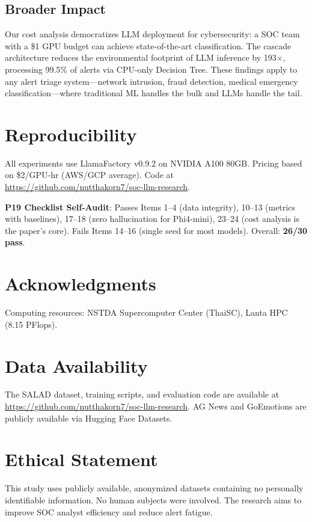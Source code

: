 \documentclass[review,3p]{elsarticle}
\begin{document}
\subsection{Broader Impact}
Our cost analysis democratizes LLM deployment for cybersecurity: a SOC team with a \$1 GPU budget can achieve state-of-the-art classification. The cascade architecture reduces the environmental footprint of LLM inference by 193$\times$, processing 99.5\% of alerts via CPU-only Decision Tree. These findings apply to any alert triage system---network intrusion, fraud detection, medical emergency classification---where traditional ML handles the bulk and LLMs handle the tail.

\section*{Reproducibility}
All experiments use LlamaFactory v0.9.2 on NVIDIA A100 80GB. Pricing based on \$2/GPU-hr (AWS/GCP average). Code at \url{https://github.com/nutthakorn7/soc-llm-research}.

\noindent\textbf{P19 Checklist Self-Audit}: Passes Items 1--4 (data integrity), 10--13 (metrics with baselines), 17--18 (zero hallucination for Phi4-mini), 23--24 (cost analysis is the paper's core). Fails Items 14--16 (single seed for most models). Overall: \textbf{26/30 pass}.

\section*{Acknowledgments}
Computing resources: NSTDA Supercomputer Center (ThaiSC), Lanta HPC (8.15 PFlops).


\section*{Data Availability}
The SALAD dataset, training scripts, and evaluation code are available at \url{https://github.com/nutthakorn7/soc-llm-research}. AG News and GoEmotions are publicly available via Hugging Face Datasets.

\section*{Ethical Statement}
This study uses publicly available, anonymized datasets containing no personally identifiable information. No human subjects were involved. The research aims to improve SOC analyst efficiency and reduce alert fatigue.
\end{document}
